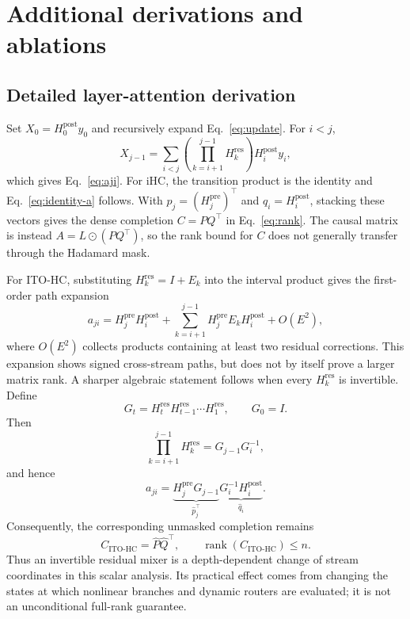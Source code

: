 \documentclass{article}
\newcommand{\Hpre}{H^{\mathrm{pre}}}
\newcommand{\Hpost}{H^{\mathrm{post}}}
\newcommand{\Hres}{H^{\mathrm{res}}}
\begin{document}



\appendix
\section{Additional derivations and ablations}

\subsection{Detailed layer-attention derivation}
\label{app:layer-attention-details}
Set $X_0=\Hpost_0y_0$ and recursively expand Eq.~\ref{eq:update}. For
$i<j$,
\begin{equation}
 X_{j-1}=\sum_{i<j}\left(\prod_{k=i+1}^{j-1}\Hres_k\right)\Hpost_i y_i,
 \label{eq:app-state-expansion}
\end{equation}
which gives Eq.~\ref{eq:aji}. For iHC, the transition product is the identity
and Eq.~\ref{eq:identity-a} follows. With $p_j=(\Hpre_j)^\top$ and
$q_i=\Hpost_i$, stacking these vectors gives the dense completion
$C=PQ^\top$ in Eq.~\ref{eq:rank}. The causal matrix is instead
$A=L\odot(PQ^\top)$, so the rank bound for $C$ does not generally transfer
through the Hadamard mask.

For ITO-HC, substituting $\Hres_k=I+E_k$ into the interval product gives the
first-order path expansion
\begin{equation}
 a_{ji}=\Hpre_j\Hpost_i+
 \sum_{k=i+1}^{j-1}\Hpre_jE_k\Hpost_i+O(E^2),
 \label{eq:path-correction}
\end{equation}
where $O(E^2)$ collects products containing at least two residual corrections.
This expansion shows signed cross-stream paths, but does not by itself prove a
larger matrix rank. A sharper algebraic statement follows when every
$\Hres_k$ is invertible. Define
\begin{equation}
 G_t=\Hres_t\Hres_{t-1}\cdots\Hres_1,\mspace{36mu} G_0=I.
 \label{eq:app-g-products}
\end{equation}
Then
\begin{equation}
 \prod_{k=i+1}^{j-1}\Hres_k=G_{j-1}G_i^{-1},
\end{equation}
and hence
\begin{equation}
 a_{ji}=\underbrace{\Hpre_jG_{j-1}}_{\widehat p_j^\top}
 \underbrace{G_i^{-1}\Hpost_i}_{\widehat q_i}.
 \label{eq:gauge-factorization}
\end{equation}
Consequently, the corresponding unmasked completion remains
\begin{equation}
 C_{\mathrm{ITO\text{-}HC}}=\widehat P\widehat Q^\top,\mspace{36mu}
 \operatorname{rank}(C_{\mathrm{ITO\text{-}HC}})\le n.
 \label{eq:ito-rank}
\end{equation}
Thus an invertible residual mixer is a depth-dependent change of stream
coordinates in this scalar analysis. Its practical effect comes from changing
the states at which nonlinear branches and dynamic routers are evaluated; it is
not an unconditional full-rank guarantee.
\end{document}
